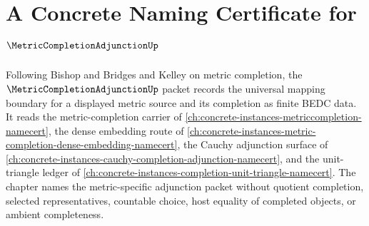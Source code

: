 \chapter{A Concrete Naming Certificate for $\MetricCompletionAdjunctionUp$}
\label{ch:concrete-instances-metric-completion-adjunction-namecert}

Following Bishop and Bridges and Kelley on metric completion, the $\MetricCompletionAdjunctionUp$ packet records the universal mapping boundary for a displayed metric source and its completion as finite BEDC data. It reads the metric-completion carrier of \autoref{ch:concrete-instances-metriccompletion-namecert}, the dense embedding route of \autoref{ch:concrete-instances-metric-completion-dense-embedding-namecert}, the Cauchy adjunction surface of \autoref{ch:concrete-instances-cauchy-completion-adjunction-namecert}, and the unit-triangle ledger of \autoref{ch:concrete-instances-completion-unit-triangle-namecert}. The chapter names the metric-specific adjunction packet without quotient completion, selected representatives, countable choice, host equality of completed objects, or ambient completeness.

